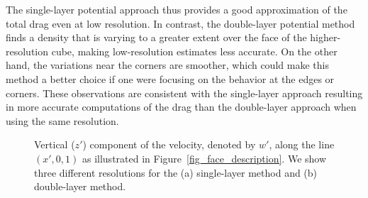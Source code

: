  The single-layer potential approach thus provides a good approximation of the total drag even at low resolution. In contrast, the double-layer potential method finds a density that is varying to a greater extent over the face of the higher-resolution cube, making low-resolution estimates less accurate. On the other hand, the variations near the corners are smoother, which could make this method a better choice if one were focusing on the behavior at the edges or corners.  These observations are consistent with the single-layer approach resulting in more accurate computations of the drag than the double-layer approach when using the same resolution.
 \par
 \begin{figure}[ht]
	\begin{center}
		\hspace{0.1cm}
	\end{center}
	\caption{Vertical ($z'$) component of the velocity, denoted by $w'$, along the line $(x',0,1)$ as illustrated in Figure~\ref{fig_face_description}.  We show three different resolutions for the (a) single-layer method and (b)  double-layer method.}
	\label{fig_cross_section}
\end{figure}

